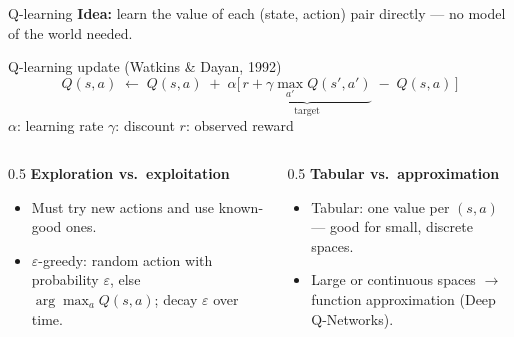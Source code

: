 \documentclass[aspectratio=169,10pt]{beamer}
\begin{document}
\begin{frame}{Q-learning}
  \textbf{Idea:} learn the value of each (state, action) pair directly --- no model of the world needed.
  \vspace{0.4em}
  \begin{block}{Q-learning update (Watkins \& Dayan, 1992)}
    \[
      Q(s,a)\;\leftarrow\;Q(s,a)\;+\;\alpha\Big[\,\underbrace{r+\gamma\max_{a'}Q(s',a')}_{\text{target}}\;-\;Q(s,a)\,\Big]
    \]
    \footnotesize $\alpha$: learning rate \quad $\gamma$: discount \quad $r$: observed reward
  \end{block}
  \vspace{0.2em}
  \begin{columns}[T]
    \begin{column}{0.5\textwidth}
      \textbf{Exploration vs.\ exploitation}
      \begin{itemize}\footnotesize
        \item Must try new actions and use known-good ones.
        \item $\varepsilon$-greedy: random action with probability $\varepsilon$, else $\arg\max_a Q(s,a)$; decay $\varepsilon$ over time.
      \end{itemize}
    \end{column}
    \begin{column}{0.5\textwidth}
      \textbf{Tabular vs.\ approximation}
      \begin{itemize}\footnotesize
        \item Tabular: one value per $(s,a)$ --- good for small, discrete spaces.
        \item Large or continuous spaces $\to$ function approximation (Deep Q-Networks).
      \end{itemize}
    \end{column}
  \end{columns}
\end{frame}
\end{document}
